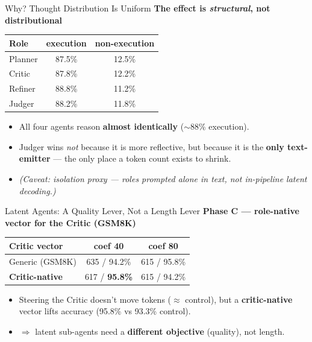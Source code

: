 \documentclass{beamer}
\begin{document}
\begin{frame}{Why? Thought Distribution Is Uniform}
    \textbf{The effect is \emph{structural}, not distributional}
    \vspace{0.2cm}
    \begin{table}[]
        \centering
        \begin{tabular}{|l|c|c|}
            \hline
            \textbf{Role} & \textbf{execution} & \textbf{non-execution} \\ \hline
            Planner & 87.5\% & 12.5\% \\ \hline
            Critic & 87.8\% & 12.2\% \\ \hline
            Refiner & 88.8\% & 11.2\% \\ \hline
            Judger & 88.2\% & 11.8\% \\ \hline
        \end{tabular}
    \end{table}
    \vspace{0.2cm}
    \begin{itemize}
        \item All four agents reason \textbf{almost identically} ($\sim$88\% execution).
        \item Judger wins \emph{not} because it is more reflective, but because it is the \textbf{only text-emitter} --- the only place a token count exists to shrink.
        \item \textit{(Caveat: isolation proxy --- roles prompted alone in text, not in-pipeline latent decoding.)}
    \end{itemize}
\end{frame}

\begin{frame}{Latent Agents: A Quality Lever, Not a Length Lever}
    \textbf{Phase C --- role-native vector for the Critic (GSM8K)}
    \vspace{0.2cm}
    \begin{table}[]
        \centering
        \begin{tabular}{|l|c|c|}
            \hline
            \textbf{Critic vector} & \textbf{coef 40} & \textbf{coef 80} \\ \hline
            Generic (GSM8K) & 635 / 94.2\% & 615 / 95.8\% \\ \hline
            \textbf{Critic-native} & 617 / \textbf{95.8\%} & 615 / 94.2\% \\ \hline
        \end{tabular}
    \end{table}
    \vspace{0.2cm}
    \begin{itemize}
        \item Steering the Critic doesn't move tokens ($\approx$ control), but a \textbf{critic-native} vector lifts accuracy (95.8\% vs 93.3\% control).
        \item $\Rightarrow$ latent sub-agents need a \textbf{different objective} (quality), not length.
    \end{itemize}
\end{frame}
\end{document}
